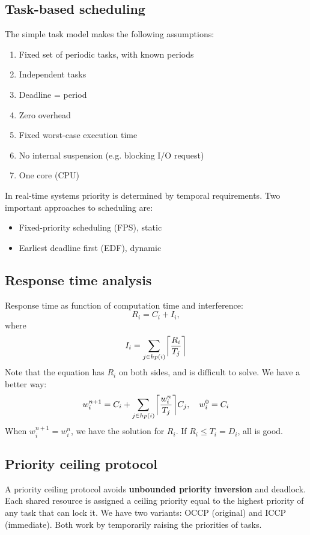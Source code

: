 \subsection{Task-based scheduling}
The simple task model makes the following assumptions:
\begin{enumerate}
    \item Fixed set of periodic tasks, with known periods
    \item Independent tasks 
    \item Deadline = period 
    \item Zero overhead
    \item Fixed worst-case execution time 
    \item No internal suspension (e.g. blocking I/O request)
    \item One core (CPU)
\end{enumerate}
In real-time systems priority is determined by temporal requirements. Two important approaches to scheduling are:
\begin{itemize}
    \item Fixed-priority scheduling (FPS), static 
    \item Earliest deadline first (EDF), dynamic 
\end{itemize}

\subsection{Response time analysis}
Response time as function of computation time and interference:
\begin{equation*}
    R_i = C_i + I_i,
\end{equation*}
where
\begin{equation*}
    I_i = \sum_{j \in hp(i)} \ceil[\bigg]{\frac{R_i}{T_j}}
\end{equation*}
Note that the equation has $R_i$ on both sides, and is difficult to solve. We have a better way:
\begin{equation*}
    w_i^{n+1} = C_i + \sum_{j \in hp(i)} \ceil[\bigg]{\frac{w_i^n}{T_j}}C_j, \quad w_i^0 = C_i
\end{equation*}
When $w_i^{n+1} = w_i^n$, we have the solution for $R_i$. If $R_i \leq T_i = D_i$, all is good.

\subsection{Priority ceiling protocol}
A priority ceiling protocol avoids \textbf{unbounded priority inversion} and deadlock. Each shared resource is assigned a ceiling priority equal to the highest priority of any task that can lock it. We have two variants: OCCP (original) and ICCP (immediate). Both work by temporarily raising the priorities of tasks.

